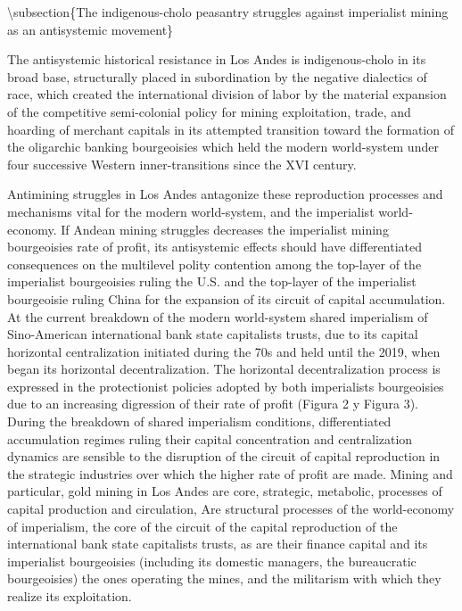 \documentclass[
]{article}
\begin{document}
\textbackslash subsection\{The indigenous-cholo peasantry struggles
against imperialist mining as an antisystemic movement\}

The antisystemic historical resistance in Los Andes is indigenous-cholo
in its broad base, structurally placed in subordination by the negative
dialectics of race, which created the international division of labor by
the material expansion of the competitive semi-colonial policy for
mining exploitation, trade, and hoarding of merchant capitals in its
attempted transition toward the formation of the oligarchic banking
bourgeoisies which held the modern world-system under four successive
Western inner-transitions since the XVI century.

Antimining struggles in Los Andes antagonize these reproduction
processes and mechanisms vital for the modern world-system, and the
imperialist world-economy. If Andean mining struggles decreases the
imperialist mining bourgeoisies\textquotesingle{} rate of profit,
it\textquotesingle s antisystemic effects should have differentiated
consequences on the multilevel polity contention among the top-layer of
the imperialist bourgeoisies ruling the U.S. and the top-layer of the
imperialist bourgeoisie ruling China for the expansion of its circuit of
capital accumulation. At the current breakdown of the modern
world-system shared imperialism of Sino-American international bank
state capitalists trusts, due to its capital horizontal centralization
initiated during the \textquotesingle70s and held until the 2019, when
began its horizontal decentralization. The horizontal decentralization
process is expressed in the protectionist policies adopted by both
imperialists bourgeoisies due to an increasing digression of their rate
of profit (Figura 2 y Figura 3). During the breakdown of shared
imperialism conditions, differentiated accumulation regimes ruling their
capital concentration and centralization dynamics are sensible to the
disruption of the circuit of capital reproduction in the strategic
industries over which the higher rate of profit are made. Mining and
particular, gold mining in Los Andes are core, strategic, metabolic,
processes of capital production and circulation, Are structural
processes of the world-economy of imperialism, the core of the circuit
of the capital reproduction of the international bank state capitalists
trusts, as are their finance capital and its imperialist bourgeoisies
(including its domestic managers, the bureaucratic bourgeoisies) the
ones operating the mines, and the militarism with which they realize its
exploitation.
\end{document}
